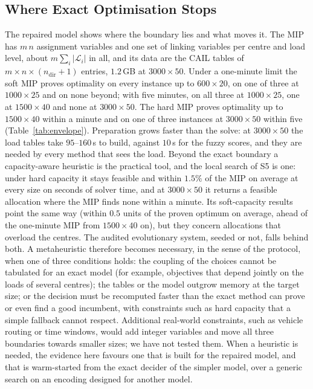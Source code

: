 \documentclass[systems,article,accept,moreauthors,pdftex]{Definitions/mdpi}
\begin{document}
\subsection{Where Exact Optimisation Stops}\label{sec:boundary}
The repaired model shows where the boundary lies and what moves it. The MIP has
$m\,n$ assignment variables and one set of linking variables per centre and load level, about
$m \sum_i |\mathcal{L}_i|$ in all, and its data are the CAIL tables of
$m \times n \times (n_{\mathrm{dir}}+1)$ entries, $1.2$\,GB at $3000 \times 50$. Under a
one-minute limit the soft MIP proves optimality on every instance up to $600 \times 20$, on one of
three at $1000 \times 25$ and on none beyond; with five minutes, on all three at $1000 \times 25$,
one at $1500 \times 40$ and none at $3000 \times 50$. The hard MIP proves optimality up to
$1500 \times 40$ within a minute and on one of three instances at $3000 \times 50$ within five
(Table~\ref{tab:envelope}). Preparation grows faster than the solve: at $3000 \times 50$ the
load tables take $95$--$160$\,s to build, against $10$\,s for the fuzzy scores, and they are needed
by every method that sees the load. Beyond the exact boundary a capacity-aware heuristic is the
practical tool, and the local search of S5 is one: under hard capacity it stays feasible and
within $1.5\%$ of the MIP on average at every size on seconds of solver time, and at
$3000 \times 50$ it returns a feasible allocation where the MIP finds none within a minute. Its
soft-capacity results point the same way (within $0.5$ units of the proven optimum on average,
ahead of the one-minute MIP from $1500 \times 40$ on), but they concern allocations that
overload the centres. The audited evolutionary system, seeded or not, falls behind both. A metaheuristic therefore becomes necessary, in the sense of the protocol, when one
of three conditions holds: the coupling of the choices cannot be tabulated for an exact model (for
example, objectives that depend jointly on the loads of several centres); the tables or the model
outgrow memory at the target size; or the decision must be recomputed faster than the exact method
can prove or even find a good incumbent, with constraints such as hard capacity that a simple
fallback cannot respect. Additional real-world constraints, such as vehicle routing or time
windows, would add integer variables and move all three boundaries towards smaller sizes; we have not tested them. When a heuristic is needed, the evidence here favours one that is built
for the repaired model, and that is warm-started from the exact decider of the simpler model, over
a generic search on an encoding designed for another model.
\end{document}
